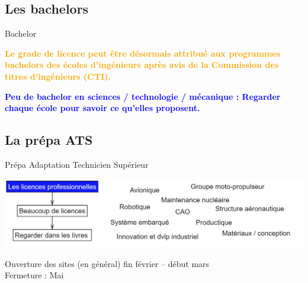 \documentclass[usenames,dvipsnames,13pt,aspectratio=169]{beamer}
\begin{document}
\subsection{Les bachelors}


\begin{frame}{Bachelor}

\textcolor{orange}{\textbf{Le grade de licence peut être désormais attribué aux programmes bachelors des écoles d’ingénieurs après avis de la Commission des titres d'ingénieurs (CTI).}}


\textcolor{blue}{\textbf{Peu de bachelor en sciences / technologie / mécanique : Regarder chaque école pour savoir ce qu'elles proposent.}}



\end{frame}





\subsection{La prépa ATS}

\begin{frame}{Prépa Adaptation Technicien Supérieur}

	\begin{center}
	     \includegraphics[width=1\textwidth]{S15.png}
	\end{center}

Ouverture des sites (en général) fin février – début mars \\
Fermeture : Mai

\end{frame}
\end{document}
